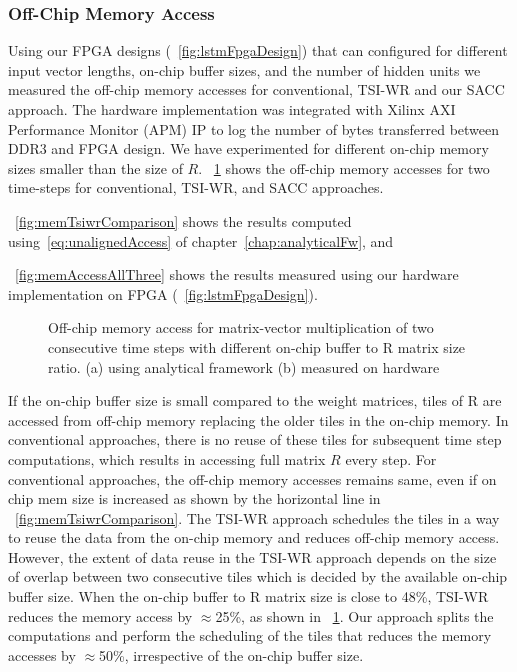 {\subsubsection{Off-Chip Memory Access}
Using our FPGA designs (\figurename{~\ref{fig:lstmFpgaDesign}}) that can configured for different input vector lengths, on-chip buffer sizes, and the number of hidden units we measured the off-chip memory accesses for conventional, TSI-WR and our SACC approach. The hardware implementation was integrated with Xilinx AXI Performance Monitor (APM) IP to log the number of bytes transferred between DDR3 and FPGA design.
We have experimented for different on-chip memory sizes smaller than the size of $R$. \figurename{~\ref{fig:memAccessImprovement}} shows the off-chip memory accesses for two time-steps for conventional, TSI-WR, and SACC approaches.  \figurename{~\ref{fig:memTsiwrComparison} shows the results computed using~\eqref{eq:unalignedAccess} of chapter~\ref{chap:analyticalFw}, and \figurename{~\ref{fig:memAccessAllThree} shows the results measured using our hardware implementation on FPGA (\figurename{~\ref{fig:lstmFpgaDesign}}). 

\begin{figure}[htb!]
	\centering
	\hspace{2.0em}
	\caption{Off-chip memory access for matrix-vector multiplication of two consecutive time steps with different on-chip buffer to R matrix size ratio.  (a)  using analytical framework (b) measured on hardware}	
	\label{fig:memAccessImprovement}
	\vspace{-1.0em}	
\end{figure}
If the on-chip buffer size is small compared to the weight matrices, tiles of R are accessed from off-chip memory replacing the older tiles in the on-chip memory. In conventional approaches, there is no reuse of these tiles for subsequent time step computations, which results in accessing full matrix $R$ every step. For conventional approaches, the off-chip memory accesses remains same, even if on chip mem size is increased as shown by the horizontal line in \figurename{~\ref{fig:memTsiwrComparison}.
The TSI-WR approach schedules the tiles in a way to reuse the data from the on-chip memory and reduces off-chip memory access. However, the extent of data reuse in the TSI-WR approach depends on the size of overlap between two consecutive tiles which is decided by the available on-chip buffer size. When the on-chip buffer to R matrix size is close to 48\%, TSI-WR reduces the memory access by $\approx$25\%, as shown in \figurename{~\ref{fig:memAccessImprovement}}. Our approach splits the computations and perform the scheduling of the tiles that reduces the memory accesses by $\approx$50\%, irrespective of the on-chip buffer size.
}}}}
